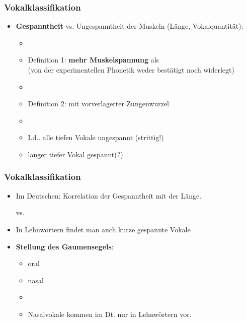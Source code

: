 \begin{frame}
\frametitle{Vokalklassifikation}

	\begin{itemize}
		\item \textbf{Gespanntheit} vs. Ungespanntheit der Muskeln (Länge, Vokalquantität):
		
		\begin{itemize}
			\item[]
			\item Definition 1: \textipa{[ i:, y:, u:, o: ]} \textbf{mehr Muskelspannung} als \textipa{[ I, Y, U, O ]}\\
			(von der experimentellen Phonetik weder bestätigt noch widerlegt)
			\item[]
			\item Definition 2: mit vorverlagerter Zungenwurzel
			\item[]
			\item I.\;d.\textscr . alle tiefen Vokale \ras ungespannt (strittig!)
			\item langer tiefer Vokal \textipa{[ a: ]} \ras gespannt(?)
		\end{itemize}
		
	\end{itemize}
	
\end{frame}



\begin{frame}
\frametitle{Vokalklassifikation}

	\begin{itemize}
	
		\item Im Deutschen: Korrelation der Gespanntheit mit der Länge.

		\ea \textipa{[ m i: t @ ]} vs. \textipa{[ m I t @ ]}
		\z

		\item In Lehnwörtern findet man auch kurze gespannte Vokale

		\ea \textipa{[ P i . d e: ]}
		\z
		
\vspace{1em}
		
		\item \textbf{Stellung des Gaumensegels}:
		
		\begin{itemize}
			\item oral
			\item nasal
			\item[]
			\item Nasalvokale kommen im Dt. nur in Lehnwörtern vor.

			\ea \textipa{[ \~a, \~o, \~E, \~\oe ]}
			\z
		
		\end{itemize}
		
	\end{itemize}
	
\end{frame}


